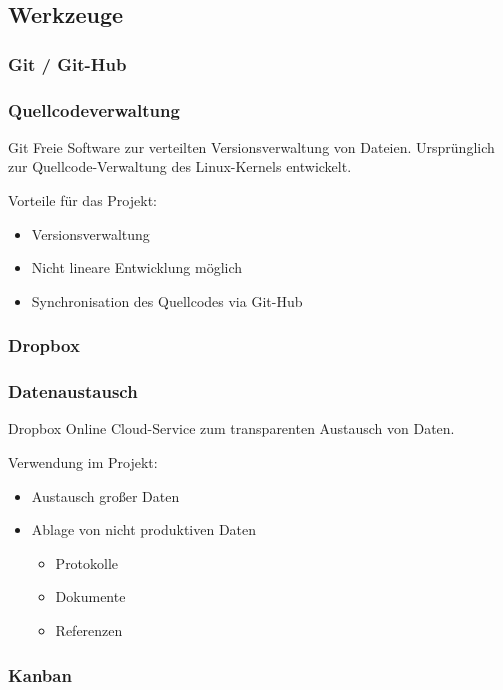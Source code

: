 \subsection{Werkzeuge} 
\subsubsection{Git / Git-Hub}

\begin{frame} 
  \frametitle{Quellcodeverwaltung}
  \begin{block}{Git}
   Freie Software zur verteilten Versionsverwaltung von Dateien. 
   Ursprünglich zur Quellcode-Verwaltung des Linux-Kernels entwickelt.
  \end{block}
  Vorteile für das Projekt:
    \begin{itemize}
      \item Versionsverwaltung
      \item Nicht lineare Entwicklung möglich
      \item Synchronisation des Quellcodes via Git-Hub
    \end{itemize}
\end{frame}

\subsubsection{Dropbox}
\begin{frame} 
  \frametitle{Datenaustausch}
  \begin{block}{Dropbox}
    Online Cloud-Service zum transparenten Austausch von Daten.
  \end{block}
  Verwendung im Projekt:
    \begin{itemize}
      \item Austausch großer Daten
      \item Ablage von nicht produktiven Daten
      \begin{itemize}
        \item Protokolle
        \item Dokumente
        \item Referenzen
      \end{itemize}
    \end{itemize}
\end{frame}

\subsubsection{Kanban}

